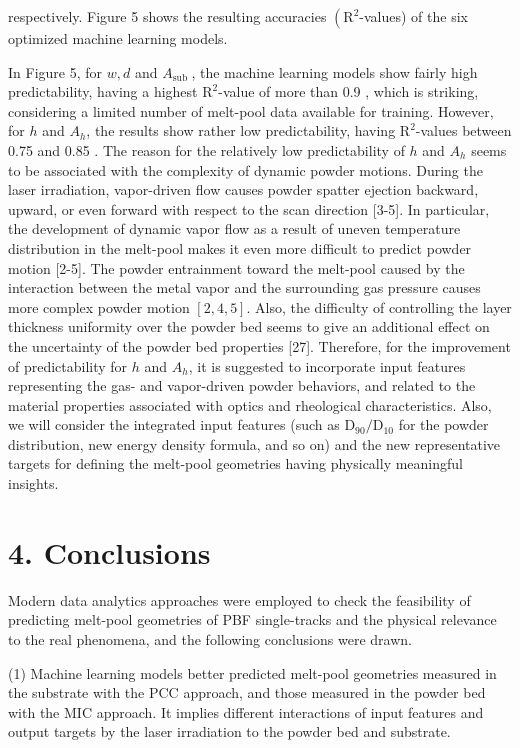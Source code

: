\documentclass[10pt]{article}
\begin{document}
respectively. Figure 5 shows the resulting accuracies $\left(\mathrm{R}^{2}\right.$-values) of the six optimized machine learning models.

In Figure 5, for $w, d$ and $A_{\text {sub }}$, the machine learning models show fairly high predictability, having a highest $\mathrm{R}^{2}$-value of more than 0.9 , which is striking, considering a limited number of melt-pool data available for training. However, for $h$ and $A_{h}$, the results show rather low predictability, having $\mathrm{R}^{2}$-values between 0.75 and 0.85 . The reason for the relatively low predictability of $h$ and $A_{h}$ seems to be associated with the complexity of dynamic powder motions. During the laser irradiation, vapor-driven flow causes powder spatter ejection backward, upward, or even forward with respect to the scan direction [3-5]. In particular, the development of dynamic vapor flow as a result of uneven temperature distribution in the melt-pool makes it even more difficult to predict powder motion [2-5]. The powder entrainment toward the melt-pool caused by the interaction between the metal vapor and the surrounding gas pressure causes more complex powder motion $[2,4,5]$. Also, the difficulty of controlling the layer thickness uniformity over the powder bed seems to give an additional effect on the uncertainty of the powder bed properties [27]. Therefore, for the improvement of predictability for $h$ and $A_{h}$, it is suggested to incorporate input features representing the gas- and vapor-driven powder behaviors, and related to the material properties associated with optics and rheological characteristics. Also, we will consider the integrated input features (such as $\mathrm{D}_{90} / \mathrm{D}_{10}$ for the powder distribution, new energy density formula, and so on) and the new representative targets for defining the melt-pool geometries having physically meaningful insights.

\section*{4. Conclusions}
Modern data analytics approaches were employed to check the feasibility of predicting melt-pool geometries of PBF single-tracks and the physical relevance to the real phenomena, and the following conclusions were drawn.

(1) Machine learning models better predicted melt-pool geometries measured in the substrate with the PCC approach, and those measured in the powder bed with the MIC approach. It implies different interactions of input features and output targets by the laser irradiation to the powder bed and substrate.
\end{document}
